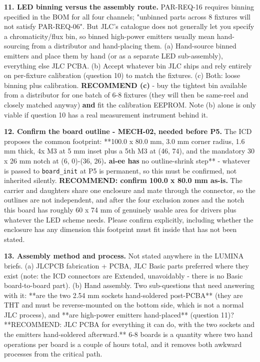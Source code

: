\documentclass[11pt,a4paper]{article}
\begin{document}
\textbf{11. LED binning versus the assembly route.} PAR-REQ-16 requires binning specified in the BOM for all four channels; "unbinned parts across 8 fixtures will not satisfy PAR-REQ-06". But JLC's catalogue does not generally let you specify a chromaticity/flux bin, so binned high-power emitters usually mean hand-sourcing from a distributor and hand-placing them. (a) Hand-source binned emitters and place them by hand (or as a separate LED sub-assembly), everything else JLC PCBA. (b) Accept whatever bin JLC ships and rely entirely on per-fixture calibration (question 10) to match the fixtures. (c) Both: loose binning plus calibration. \textbf{RECOMMEND (c)} - buy the tightest bin available from a distributor for one batch of 6-8 fixtures (they will then be same-reel and closely matched anyway) \textbf{and} fit the calibration EEPROM. Note (b) alone is only viable if question 10 has a real measurement instrument behind it.

\textbf{12. Confirm the board outline - MECH-02, needed before P5.} The ICD proposes the common footprint: {*}{*}100.0 x 80.0 mm, 3.0 mm corner radius, 1.6 mm thick, 4x M3 at 5 mm inset plus a 5th M3 at (46, 74), and the mandatory 30 x 26 mm notch at (6, 0)-(36, 26)\textbf{. ai-ee has }no outline-shrink step{*}{*} - whatever is passed to \texttt{board\_init} at P5 is permanent, so this must be confirmed, not inherited silently. \textbf{RECOMMEND: confirm 100.0 x 80.0 mm as-is.} The carrier and daughters share one enclosure and mate through the connector, so the outlines are not independent, and after the four exclusion zones and the notch this board has roughly 60 x 74 mm of genuinely usable area for drivers plus whatever the LED scheme needs. Please confirm explicitly, including whether the enclosure has any dimension this footprint must fit inside that has not been stated.

\textbf{13. Assembly method and process.} Not stated anywhere in the LUMINA briefs. (a) JLCPCB fabrication + PCBA, JLC Basic parts preferred where they exist (note: the ICD connectors are Extended, unavoidably - there is no Basic board-to-board part). (b) Hand assembly. Two sub-questions that need answering with it: {*}{*}are the two 2.54 mm sockets hand-soldered post-PCBA{*}{*} (they are THT and must be reverse-mounted on the bottom side, which is not a normal JLC process), and {*}{*}are high-power emitters hand-placed{*}{*} (question 11)? {*}{*}RECOMMEND: JLC PCBA for everything it can do, with the two sockets and the emitters hand-soldered afterward.{*}{*} 6-8 boards is a quantity where two hand operations per board is a couple of hours total, and it removes both awkward processes from the critical path.
\end{document}
